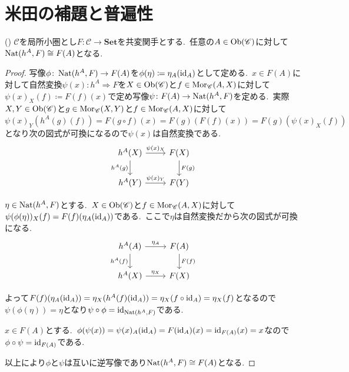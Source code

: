 
\section{米田の補題と普遍性}

\begin{theorem} \label{thm: yoneda_lemma} ()
$\mathscr{C}$を局所小圏とし$F \colon \mathscr{C} \to \mathbf{Set}$を共変関手とする.\
任意の$A \in \operatorname{Ob}(\mathscr{C})$に対して$\operatorname{Nat}(h^A, F) \cong F(A)$となる.
\end{theorem}
\begin{proof}
写像$\phi \colon \operatorname{Nat}(h^A, F) \to F(A)$を$\phi(\eta) \coloneq \eta_A(\operatorname{id}_A)$として定める.\
$x \in F(A)$に対して自然変換$\psi(x) \colon h^A \Rightarrow F$を$X \in \operatorname{Ob}(\mathscr{C})$と$f \in \operatorname{Mor}_\mathscr{C}(A, X)$に対して$\psi(x)_X(f) \coloneq F(f)(x)$で定め写像$\psi \colon F(A) \to \operatorname{Nat}(h^A, F)$を定める.\
実際$X, Y \in \operatorname{Ob}(\mathscr{C})$と$g \in \operatorname{Mor}_\mathscr{C}(X, Y)$と$f \in \operatorname{Mor}_\mathscr{C}(A, X)$に対して$\psi(x)_Y(h^A(g)(f)) = F(g \circ f)(x) = F(g)(F(f)(x)) = F(g)(\psi(x)_X(f))$となり次の図式が可換になるので$\psi(x)$は自然変換である.
\[\begin{tikzcd}
	{h^A(X)} & {F(X)} \\
	{h^A(Y)} & {F(Y)}
	\arrow["{\psi(x)_X}", from=1-1, to=1-2]
	\arrow["{h^A(g)}"', from=1-1, to=2-1]
	\arrow["{F(g)}", from=1-2, to=2-2]
	\arrow["{\psi(x)_Y}", from=2-1, to=2-2]
\end{tikzcd}\]

$\eta \in \operatorname{Nat}(h^A, F)$とする.\
$X \in \operatorname{Ob}(\mathscr{C})$と$f \in \operatorname{Mor}_\mathscr{C}(A, X)$に対して$\psi(\phi(\eta))_X(f) = F(f)(\eta_A(\operatorname{id}_A))$である.\
ここで$\eta$は自然変換だから次の図式が可換になる.
\[\begin{tikzcd}
	{h^A(A)} & {F(A)} \\
	{h^A(X)} & {F(X)}
	\arrow["{\eta_A}", from=1-1, to=1-2]
	\arrow["{h^A(f)}"', from=1-1, to=2-1]
	\arrow["{F(f)}", from=1-2, to=2-2]
	\arrow["{\eta_X}", from=2-1, to=2-2]
\end{tikzcd}\]

よって$F(f)(\eta_A(\operatorname{id}_A)) = \eta_X(h^A(f)(\operatorname{id}_A)) = \eta_X(f \circ \operatorname{id}_A) = \eta_X(f)$となるので$\psi(\phi(\eta)) = \eta$となり$\psi \circ \phi = \operatorname{id}_{\operatorname{Nat}(h^A, F)}$である.

$x \in F(A)$とする.\
$\phi(\psi(x)) = \psi(x)_A(\operatorname{id}_A) = F(\operatorname{id}_A)(x) = \operatorname{id}_{F(A)}(x) = x$なので$\phi \circ \psi = \operatorname{id}_{F(A)}$である.

以上により$\phi$と$\psi$は互いに逆写像であり$\operatorname{Nat}(h^A, F) \cong F(A)$となる.
\end{proof}

